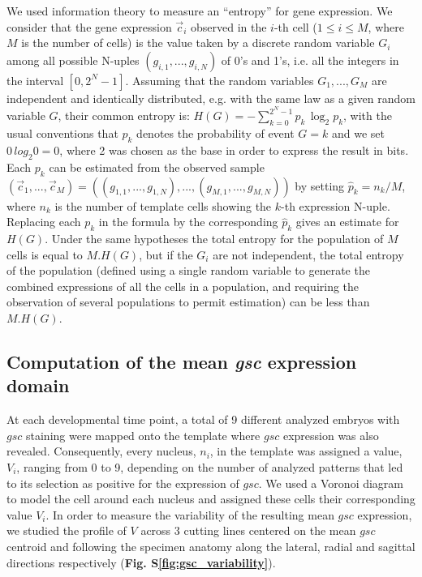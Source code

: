 We used information theory to measure an ``entropy'' for gene expression. We consider that the gene expression $\vec{c}_i$ observed in the $i$-th cell ($1 \leq i \leq M$, where $M$ is the number of cells) is the value taken by a discrete random variable $G_i$ among all possible N-uples $(g_{i,1}, ..., g_{i,N})$ of 0's and 1's, i.e. all the integers in the interval $[0,2^N-1]$. Assuming that the random variables $G_1, ..., G_M$ are independent and identically distributed, e.g. with the same law as a given random variable $G$, their common entropy is: $H(G)= - \sum_{k=0}^{2^N-1} p_{k}\,\log_{2}p_{k}$, with the usual conventions that $p_k$ denotes the probability of event $G = k$ and we set $0\,log_{2}0=0$, where 2 was chosen as the base in order to express the result in bits. Each $p_k$ can be estimated from the observed sample $(\vec{c}_1, ..., \vec{c}_M) = ((g_{1,1}, ..., g_{1,N}), ..., (g_{M,1}, ..., g_{M,N}))$ by setting $\hat{p}_k = n_k/M$, where $n_k$ is the number of template cells showing the $k$-th expression N-uple. Replacing each $p_k$ in the formula by the corresponding $\hat{p}_k$ gives an estimate for $H(G)$. Under the same hypotheses the total entropy for the population of $M$ cells is equal to $M.H(G)$, but if the $G_i$ are not independent, the total entropy of the population (defined using a single random variable to generate the combined expressions of all the cells in a population, and requiring the observation of several populations to permit estimation) can be less than $M.H(G)$.

\subsection*{Computation of the mean \emph{gsc} expression domain}
\label{sec:Mean_gsc}
At each developmental time point, a total of 9 different analyzed embryos with $gsc$ staining were mapped onto the template where $gsc$ expression was also revealed. Consequently, every nucleus, $n_i$, in the template was assigned a value, $V_i$, ranging from 0 to 9, depending on the number of analyzed patterns that led to its selection as positive for the expression of $gsc$. We used a Voronoi diagram to model the cell around each nucleus and assigned these cells their corresponding value $V_i$. In order to measure the variability of the resulting mean $gsc$ expression, we studied the profile of $V$ across 3 cutting lines centered on the mean $gsc$ centroid and following the specimen anatomy along the lateral, radial and sagittal directions respectively (\textbf{Fig. S\ref{fig:gsc_variability}}).

